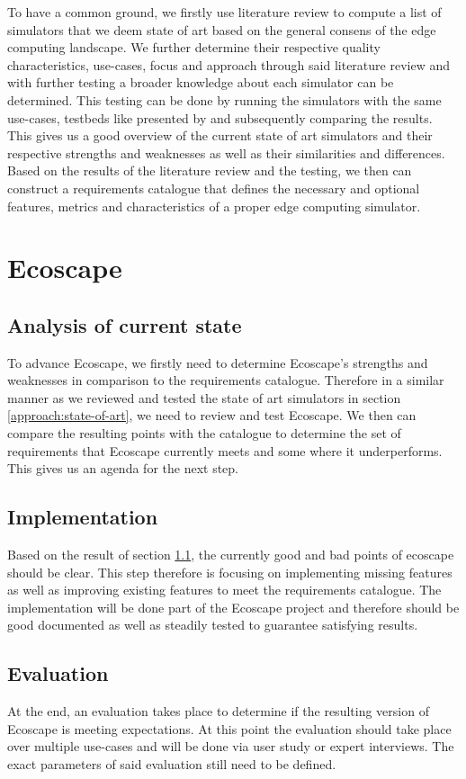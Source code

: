 To have a common ground, we firstly use literature review to compute a list of simulators that we deem state of art based on the general consens of the edge computing landscape.
We further determine their respective quality characteristics, use-cases, focus and approach through said literature review and with further testing a broader knowledge about each simulator can be determined.
This testing can be done by running the simulators with the same use-cases, testbeds like presented by \cite{pfandzelter2024lessonslearnedbuildingedge} and subsequently comparing the results.
This gives us a good overview of the current state of art simulators and their respective strengths and weaknesses as well as their similarities and differences.
Based on the results of the literature review and the testing, we then can construct a requirements catalogue that defines the necessary and optional features, metrics and characteristics of a proper edge computing simulator.

\section{Ecoscape}\label{approach:ecoscape}
\subsection{Analysis of current state}\label{approach:ecoscape-current-state}
To advance Ecoscape, we firstly need to determine Ecoscape's strengths and weaknesses in comparison to the requirements catalogue. 
Therefore in a similar manner as we reviewed and tested the state of art simulators in section \ref{approach:state-of-art}, we need to review and test Ecoscape.
We then can compare the resulting points with the catalogue to determine the set of requirements that Ecoscape currently meets and some where it underperforms.
This gives us an agenda for the next step.

\subsection{Implementation}\label{approach:ecoscape-implementation}
Based on the result of section \ref{approach:ecoscape-current-state}, the currently good and bad points of ecoscape should be clear. This step therefore is focusing on implementing missing features as well as improving existing features 
to meet the requirements catalogue.
The implementation will be done part of the Ecoscape project and therefore should be good documented as well as steadily tested to guarantee satisfying results. 

\subsection{Evaluation}\label{approach:ecoscape-evaluation}
At the end, an evaluation takes place to determine if the resulting version of Ecoscape is meeting expectations. At this point the evaluation should take place over multiple use-cases and will be done via user study or expert interviews.
The exact parameters of said evaluation still need to be defined.